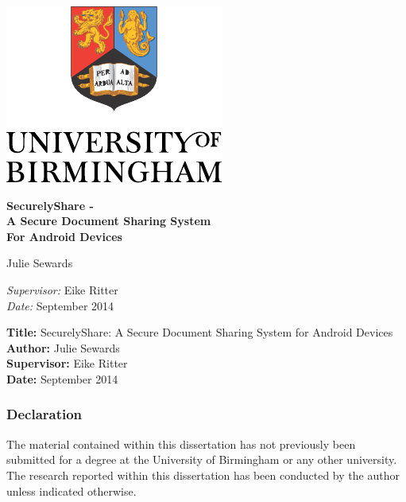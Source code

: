 
\begin{titlepage}
	\begin{center}
		\vspace*{\fill}

		\centering
		\includegraphics[scale=1.3]{Logo.pdf}
		\vfill

		{\LARGE\bf SecurelyShare - \\
			A Secure Document Sharing System\\
			For  Android Devices}


		\vfill
		{\Large Julie Sewards}
		\vfill

		\vfill
		\textit{Supervisor:} Eike Ritter \\
		\vfill
		\textit{Date:} September 2014
		\vfill
		\vfill

	\end{center}
\end{titlepage}

\thispagestyle{empty}

\textbf{Title:} SecurelyShare: A Secure Document Sharing
System for Android Devices\\
\textbf{Author:} Julie Sewards \\
\textbf{Supervisor:} Eike Ritter \\
\textbf{Date:} September 2014 \\
\textbf{}
\vfill
\vfill

\subsubsection*{Declaration}

The material contained within this dissertation has not previously been
submitted for a degree at the University of Birmingham or any other university.
The research reported within this dissertation has been conducted by the author
unless indicated otherwise.\\

